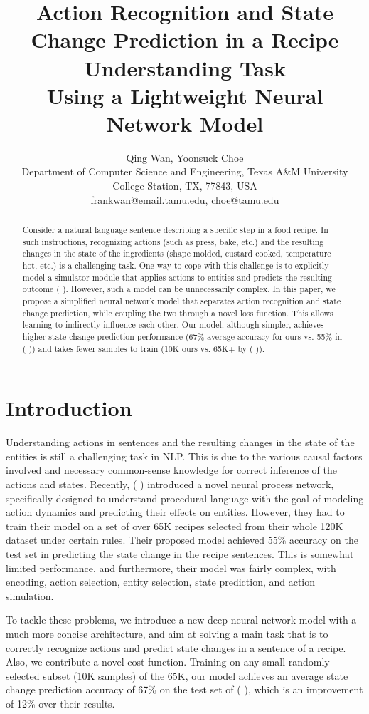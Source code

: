 \documentclass[letterpaper]{article}
\title{Action Recognition and State Change Prediction in a Recipe Understanding Task \\ 
	Using a Lightweight Neural Network Model \\}
\author{
	Qing Wan,
	Yoonsuck Choe \\
	Department of Computer Science and Engineering, Texas A\&M University\\
	College Station, TX, 77843, USA \\ 
	frankwan@email.tamu.edu, choe@tamu.edu
}
\newcommand{\citealp}[1]{\citeauthor{#1} \citeyear{#1}}
\begin{document}
\maketitle

\begin{abstract}
Consider a natural language sentence describing a specific step in a food recipe. In such instructions, recognizing actions (such as press, bake, etc.) and the resulting changes in the state of the ingredients (shape molded, custard cooked, temperature hot, etc.) is a challenging task. One way to cope with this challenge is to explicitly model a simulator module that applies actions to entities and predicts the resulting outcome (\citealp{bosselut2017simulating}). However, such a model can be unnecessarily complex. In this paper, we propose a simplified neural network model that separates action recognition and state change prediction, while coupling the two through a novel loss function.  This allows learning to indirectly influence each other. Our model, although simpler, achieves higher state change prediction performance (67\% average accuracy for ours vs. 55\% in (\citealp{bosselut2017simulating})) and takes fewer samples to train (10K ours vs. 65K+ by (\citealp{bosselut2017simulating})).
\end{abstract}

\noindent
\section*{Introduction}
Understanding actions in sentences and the resulting changes in the state of the entities is still a challenging task in NLP.  This is due to the various causal factors involved and necessary common-sense knowledge for correct inference of the actions and states. Recently, (\citealp{bosselut2017simulating}) introduced a novel neural process network, specifically designed to understand procedural language with the goal of modeling action dynamics and predicting their effects on entities. However, they had to train their model on a set of over 65K recipes selected from their whole 120K dataset under certain rules. Their proposed model achieved 55\% accuracy on the test set in predicting the state change in the recipe sentences. This is somewhat limited performance, and furthermore, their model was fairly complex, with encoding, action selection, entity selection, state prediction, and action simulation.

To tackle these problems, we introduce a new deep neural network model with a much more concise architecture, and aim at solving a main task that is to correctly recognize actions and predict state changes in a sentence of a recipe. Also, we contribute a novel cost function. Training on any small randomly selected subset (10K samples) of the 65K, our model achieves an average state change prediction accuracy of 67\% on the test set of (\citealp{bosselut2017simulating}), which is an improvement of 12\% over their results.
\end{document}
